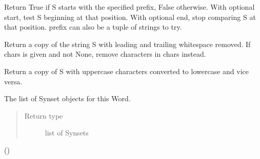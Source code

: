 \documentclass[letterpaper,10pt,english]{sphinxmanual}
\begin{document}
\begin{fulllineitems}

\begin{fulllineitems}
\label{api_reference:textblob_de.blob.Word.startswith}
Return True if S starts with the specified prefix, False otherwise.
With optional start, test S beginning at that position.
With optional end, stop comparing S at that position.
prefix can also be a tuple of strings to try.

\end{fulllineitems}


\begin{fulllineitems}
\label{api_reference:textblob_de.blob.Word.strip}
Return a copy of the string S with leading and trailing
whitespace removed.
If chars is given and not None, remove characters in chars instead.

\end{fulllineitems}


\begin{fulllineitems}
\label{api_reference:textblob_de.blob.Word.swapcase}
Return a copy of S with uppercase characters converted to lowercase
and vice versa.

\end{fulllineitems}


\begin{fulllineitems}
\label{api_reference:textblob_de.blob.Word.synsets}
The list of Synset objects for this Word.
\begin{quote}\begin{description}
\item[{Return type}] \leavevmode
list of Synsets

\end{description}\end{quote}

()


\end{fulllineitems}
\end{fulllineitems}
\end{document}
